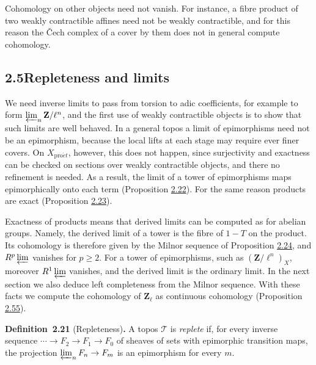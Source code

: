 \documentclass[11pt]{article}
\newenvironment{bpstatement}[2]{\par\addvspace{0.6\baselineskip}\noindent\textbf{#1}#2\textbf{.}\enspace\ignorespaces}
  {\par\addvspace{0.4\baselineskip}}
\begin{document}
Cohomology on other objects need not vanish. For instance, a fibre product of two weakly contractible affines need not be weakly contractible, and for this reason the Čech complex of a cover by them does not in general compute cohomology.


\subsection*{\texorpdfstring{2.5\quad Repleteness and limits}{2.5 Repleteness and limits}}
\label{bp62}%
\label{bp63}%
We need inverse limits to pass from torsion to adic coefficients, for example to form \(\varprojlim_n\mathbf Z/\ell^n\), and the first use of weakly contractible objects is to show that such limits are well behaved. In a general topos a limit of epimorphisms need not be an epimorphism, because the local lifts at each stage may require ever finer covers. On \(X_{\mathrm{pro}\acute{e}t}\), however, this does not happen, since surjectivity and exactness can be checked on sections over weakly contractible objects, and there no refinement is needed. As a result, the limit of a tower of epimorphisms maps epimorphically onto each term (Proposition \hyperref[bp65]{2.22}). For the same reason products are exact (Proposition \hyperref[bp68]{2.23}).

Exactness of products means that derived limits can be computed as for abelian groups. Namely, the derived limit of a tower is the fibre of \(1-T\) on the product. Its cohomology is therefore given by the Milnor sequence of Proposition \hyperref[bp71]{2.24}, and \(R^p\varprojlim\) vanishes for \(p\geq2\). For a tower of epimorphisms, such as \((\mathbf Z/\ell^n)_X\), moreover \(R^1\varprojlim\) vanishes, and the derived limit is the ordinary limit. In the next section we also deduce left completeness from the Milnor sequence. With these facts we compute the cohomology of \(\mathbf Z_\ell\) as continuous cohomology (Proposition \hyperref[bp172]{2.55}).

\label{bp64}%
\begin{bpstatement}{Definition~2.21}{ (Repleteness)}
A topos \(\mathcal T\) is \emph{replete} if, for every inverse sequence \(\cdots\to F_2\to F_1\to F_0\) of sheaves of sets with epimorphic transition maps, the projection \(\varprojlim_nF_n\to F_m\) is an epimorphism for every \(m\).
\end{bpstatement}
\end{document}
